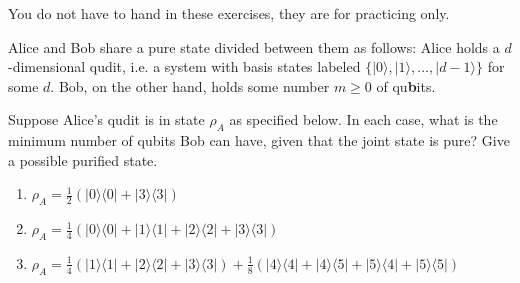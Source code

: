 \documentclass[a4paper,10pt,landscape,twocolumn]{scrartcl}
\newcommand{\ket}[1]{| #1 \rangle}
\newcommand{\bra}[1]{\langle #1 |}
\begin{document}
\practiceproblems

{\sffamily\noindent
You do not have to hand in these exercises, they are for practicing only. %
}

\begin{exercise}
Alice and Bob share a pure state divided between them as follows: Alice holds a $d$-dimensional qudit, i.e. a system with basis states labeled $\{ \ket{0}, \ket{1}, \ldots, \ket{d-1} \}$ for some $d$. Bob, on the other hand, holds some number $m \geq 0$ of qu{\bf b}its.

Suppose Alice's qudit is in state $\rho_A$ as specified below. In each case, what is the minimum number of qubits Bob can have, given that the joint state is pure? Give a possible purified state.
\begin{enumerate}
\item $\rho_A = \frac12( \ket{0}\bra{0}+\ket{3}\bra{3})$
\item $\rho_A = \frac{1}{4}( \ket{0}\bra{0} +\ket{1}\bra{1}+\ket{2}\bra{2}+\ket{3}\bra{3})$
\item $\rho_A = \frac{1}{4}(\ket{1}\bra{1}+\ket{2}\bra{2}+\ket{3}\bra{3}) + \frac{1}{8} ( \ket{4}\bra{4} + \ket{4}\bra{5} + \ket{5} \bra{4} + \ket{5} \bra{5} )$
\end{enumerate}
\end{exercise}
\end{document}
